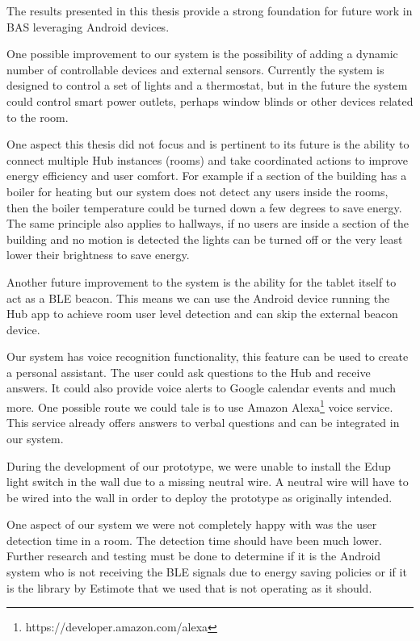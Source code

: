 The results presented in this thesis provide a strong foundation for future work in \ac{BAS} leveraging Android devices. 

One possible improvement to our system  is the possibility of adding a dynamic number of controllable devices and external sensors. Currently the system is designed to control a set of lights and a thermostat, but in the future the system could control smart power outlets, perhaps window blinds or other devices related to the room.

One aspect this thesis did not focus and is pertinent to its future is the ability to connect multiple Hub instances (rooms) and take coordinated actions to improve energy efficiency and user comfort. For example if a section of the building has a boiler for heating but our system does not detect any users inside the rooms, then the boiler temperature could be turned down a few degrees to save energy. The same principle also applies to hallways, if no users are inside a section of the building and no motion is detected the lights can be turned off or the very least lower their brightness to save energy.

Another future improvement to the system is the ability for the tablet itself to act as a \ac{BLE} beacon. This means we can use the Android device running the Hub app to achieve room user level detection and can skip the external beacon device.

Our system has voice recognition functionality, this feature can be used to create a personal assistant. The user could ask questions to the Hub and receive answers. It could also provide voice alerts to Google calendar events and much more. One possible route we could tale is to use Amazon Alexa\footnote{https://developer.amazon.com/alexa} voice service. This service already offers answers to verbal questions and can be integrated in our system.

During the development of our prototype, we were unable to install the Edup light switch in the wall due to a missing neutral wire. A neutral wire will have to be wired into the wall in order to deploy the prototype as originally intended. 

One aspect of our system we were not completely happy with was the user detection time in a room. The detection time should have been much lower. Further research and testing must be done to determine if it is the Android system who is not receiving the BLE signals due to energy saving policies or if it is the library by Estimote that we used that is not operating as it should.


\cleardoublepage
